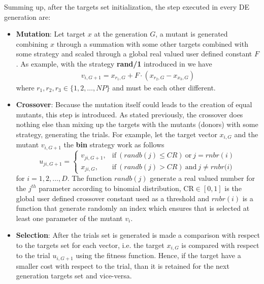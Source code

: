 Summing up, after the targets set initialization, the step executed in every DE generation are:
\begin{itemize}
	\item{\textbf{Mutation}: Let target $x$ at the generation $G$, a mutant is generated combining $x$ through a summation with some other targets combined with some strategy and scaled through a global real valued user defined constant $F$. As example, with the strategy \textbf{rand/1} introduced in \cite{DESEHGOCS:1997} we have
	\begin{align}
		v_{i,G+1} = x_{r_{1},G} + F\cdot(x_{r_{2},G} - x_{x_{3},G})
	\end{align}
	where $r_{1},r_{2},r_{3} \in \{1,2,\dots,NP\}$ and must be each other different.}
	\item{\textbf{Crossover}: Because the mutation itself could leads to the creation of equal mutants, this step is introduced. As stated previously, the crossover does nothing else than mixing up the targets with the mutants (donors) with some strategy, generating the trials. For example, let the target vector $x_{i,G}$ and the mutant $v_{i,G+1}$ the \textbf{bin} strategy work as follows
	\begin{equation}
		u_{ji, G+1} = \begin{cases}
			v_{ji,G+1}, & \textrm{if}\ (\textit{randb}(j) \leq \textit{CR})\ \textrm{or}\ j=\textit{rnbr}(i)\\
			x_{ji,G}, & \textrm{if}\ (\textit{randb}(j) > \textit{CR})\ \textrm{and}\ j\neq\textit{rnbr(i)}
		\end{cases}
	\end{equation}
	for $i=1,2,\dots,D$. The function $\textit{randb}(j)$ generate a real valued number for the $j^{th}$ parameter according to binomial distribution, $\textrm{CR}\in[0,1]$ is the global user defined crossover constant used as a threshold and $\textit{rnbr}(i)$ is a function that generate randomly an index which ensures that is selected at least one parameter of the mutant $v_{i}$.}
	\item{\textbf{Selection}: After the trials set is generated is made a comparison with respect to the targets set for each vector, i.e. the target $x_{i, G}$ is compared with respect to the trial $u_{i,G+1}$ using the fitness function. Hence, if the target have a smaller cost with respect to the trial, than it is retained for the next generation targets set and vice-versa.}
\end{itemize}


